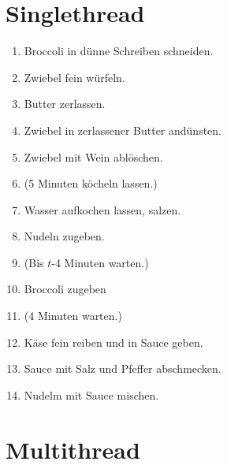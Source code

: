 \documentclass{article}
\begin{document}
\section{Singlethread}

\begin{minipage}{\textwidth}
\begin{enumerate}
    \item Broccoli in dünne Schreiben schneiden.
    \item Zwiebel fein würfeln.
    \item Butter zerlassen.
    \item Zwiebel in zerlassener Butter andünsten.
    \item Zwiebel mit Wein ablöschen.
    \item (5 Minuten köcheln lassen.)
    \item Wasser aufkochen lassen, salzen.
    \item Nudeln zugeben.
    \item (Bis $t$-4 Minuten warten.)
    \item Broccoli zugeben
    \item (4 Minuten warten.)
    \item Käse fein reiben und in Sauce geben.
    \item Sauce mit Salz und Pfeffer abschmecken.
    \item Nudelm mit Sauce mischen.
\end{enumerate}
\end{minipage}

\section{Multithread}
\end{document}
